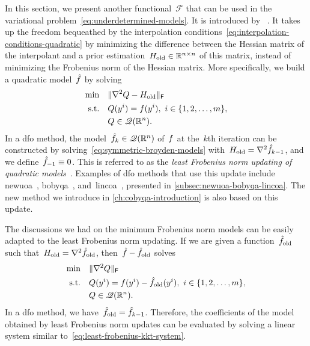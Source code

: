 In this section, we present another functional~$\mathcal{F}$ that can be used in the variational problem~\cref{eq:underdetermined-models}.
It is introduced by \citeauthor{Powell_2004b}~\cite{Powell_2004b}.
It takes up the freedom bequeathed by the interpolation conditions~\cref{eq:interpolation-conditions-quadratic} by minimizing the difference between the Hessian matrix of the interpolant and a prior estimation~$H_{\text{old}} \in \mathbb{R}^{n \times n}$ of this matrix, instead of minimizing the Frobenius norm of the Hessian matrix.
More specifically, we build a quadratic model~$\objm$ by solving
\begin{subequations}
    \label{eq:symmetric-broyden-models}
    \begin{align}
        \min        & \quad \lVert\nabla^2 Q - H_{\text{old}}\rVert_{\mathsf{F}}\\
        \text{s.t.} & \quad Q(y^i) = f(y^i), ~ i \in \{1, 2, \dots, m\},\\
                    & \quad Q \in \mathscr{Q}(\mathbb{R}^n).
    \end{align}
\end{subequations}
In a \gls{dfo} method, the model~$\objm[k] \in \qpoly$ of~$f$ at the~$k$th iteration can be constructed by solving~\cref{eq:symmetric-broyden-models} with~$H_{\text{old}} = \nabla^2 \objm[k - 1]$, and we define~$\objm[-1] \equiv 0$.
This is referred to as the \emph{least Frobenius norm updating of quadratic models}~\cite{Powell_2004b}.
Examples of \gls{dfo} methods that use this update include \gls{newuoa}~\cite{Powell_2006}, \gls{bobyqa}~\cite{Powell_2009}, and~\gls{lincoa}~\cite{Powell_2015}, presented in \cref{subsec:newuoa-bobyqa-lincoa}.
The new method we introduce in \cref{ch:cobyqa-introduction} is also based on this update.

The discussions we had on the minimum Frobenius norm models can be easily adapted to the least Frobenius norm updating.
If we are given a function~$\objm[\text{old}]$ such that~$H_{\text{old}} = \nabla^2 \objm[\text{old}]$, then~$\objm - \objm[\text{old}]$ solves
\begin{subequations}
    \label{eq:symmetric-broyden-models-reformulation}
    \begin{align}
        \min        & \quad \norm{\nabla^2 Q}_{\mathsf{F}}\\
        \text{s.t.} & \quad Q(y^i) = \obj(y^i) - \objm[\text{old}](y^i), ~ i \in \set{1, 2, \dots, m},\\
                    & \quad Q \in \qpoly.
    \end{align}
\end{subequations}
In a \gls{dfo} method, we have~$\objm[\text{old}] = \objm[k - 1]$.
Therefore, the coefficients of the model obtained by least Frobenius norm updates can be evaluated by solving a linear system similar to~\cref{eq:least-frobenius-kkt-system}.

